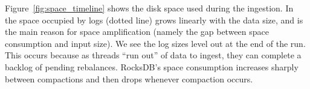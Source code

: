 Figure~\ref{fig:space_timeline} shows the disk space used during the ingestion. In \sys\, the space occupied by logs (dotted line) grows linearly with the data size, and is the main reason for space amplification (namely the gap between space consumption and input size). We see the log sizes level out at the end of the run. This occurs because as threads ``run out'' of data to ingest, they can complete a backlog of pending rebalances. 
RocksDB's space consumption increases sharply between compactions and then drops whenever compaction occurs. 


